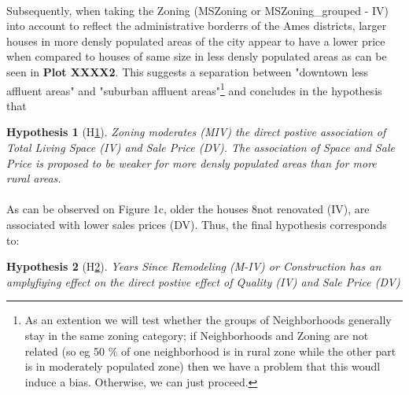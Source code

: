 \documentclass[a4paper]{article}
\newtheorem{hyp}{Hypothesis}
\begin{document}
\indent \paragraph{} Subsequently, when taking the Zoning (MSZoning or MSZoning\_grouped - IV) into account to reflect the administrative borderrs of the Ames districts, larger houses in more densly populated areas of the city appear to have a lower price when compared to houses of same size in less densly populated areas as can be seen in \textbf{Plot XXXX2}. This suggests a separation between "downtown less affluent areas" and "suburban affluent areas"\footnote{As an extention\: we will test whether the groups of Neighborhoods generally stay in the same zoning category; if Neighborhoods and Zoning are not related (so eg 50 \% of one neighborhood is in rural zone while the other part is in moderately populated zone) then we have a problem that this woudl induce a bias. Otherwise, we can just proceed.} and concludes in the hypothesis that

\begin{hyp}[H\ref{hyp:second}] \label{hyp:second}
Zoning moderates (MIV) the direct postive association of Total Living Space (IV) and Sale Price (DV). The association of Space and Sale Price is proposed to be weaker for more densly populated areas than for more rural areas. 
\end{hyp}

\begin{center}


\end{center}

\indent \paragraph{} As can be observed on Figure 1c, older the houses 8not renovated (IV), are associated with lower sales  prices (DV). Thus, the final hypothesis corresponds to: 


\begin{hyp}[H\ref{hyp:third}] \label{hyp:third}
Years Since Remodeling (M-IV) or Construction has an amplyfiying effect on the direct postive effect of Quality (IV) and Sale Price (DV)
\end{hyp}
\end{document}
